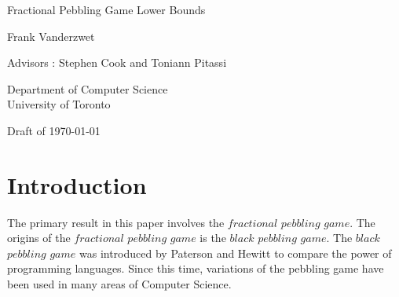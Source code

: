 \documentclass[12pt]{article}
\begin{document}
\thispagestyle{empty}

\vspace*{1.4in}

\begin{scshape}\begin{center}\fontsize{22}{22}\selectfont Fractional Pebbling Game Lower Bounds\end{center}

\vspace*{0.10in}

\begin{center}\noindent Frank Vanderzwet\end{center}

\vspace*{0.25in}

\begin{center}\noindent Advisors : Stephen Cook and Toniann Pitassi \end{center}

\vspace*{0.15in}

\begin{center}Department of Computer Science\\University of Toronto\end{center}

\vspace*{0.15in}

\begin{center}Draft of \today\end{center}\end{scshape}

\newpage

\tableofcontents 



\newpage

\setcounter{section}{0}

\section{Introduction} 


The primary result in this paper involves the $fractional $ $pebbling$ $game$. The origins of the $fractional $ $pebbling$ $game$ is the $black$ $pebbling$ $game$. The $black$ $pebbling$ $game$ was introduced by Paterson and Hewitt \cite{ph:comsc} to compare the power of programming languages. Since this time, variations of the pebbling game have been used in many areas of Computer Science.
\end{document}
